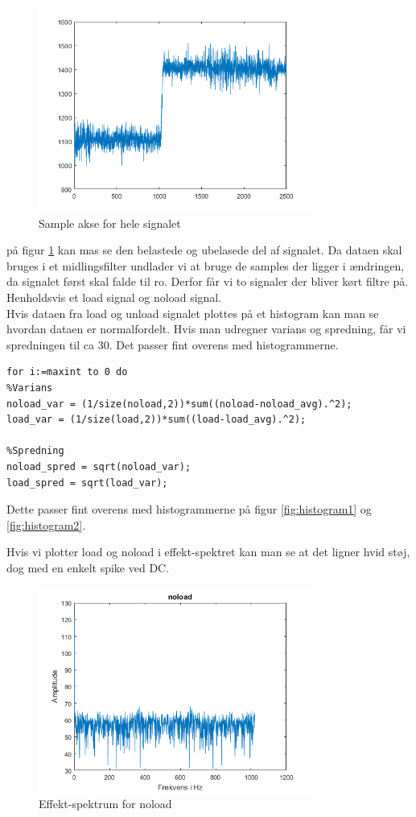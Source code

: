 \documentclass[12pt]{article}
\begin{document}
\begin{figure}[H]
	\centering
	\includegraphics[width=90mm]{Img/sample_akse.png}
	\caption{Sample akse for hele signalet}
	\label{fig:sample_akse}
\end{figure}

på figur \ref{fig:sample_akse} kan mas se den belastede og ubelasede del af signalet. Da dataen skal bruges i et midlingsfilter undlader vi at bruge de samples der ligger i ændringen, da signalet først skal falde til ro. Derfor får vi to signaler der bliver kørt filtre på. Henholdsvis et load signal og noload signal. \\
Hvis dataen fra load og unload signalet plottes på et histogram kan man se hvordan dataen er normalfordelt. Hvis man udregner varians og spredning, får vi spredningen til ca 30. Det passer fint overens med histogrammerne.

\begin{lstlisting}[frame=single]  % Start your code-block
for i:=maxint to 0 do
%Varians
noload_var = (1/size(noload,2))*sum((noload-noload_avg).^2);
load_var = (1/size(load,2))*sum((load-load_avg).^2);

%Spredning
noload_spred = sqrt(noload_var);
load_spred = sqrt(load_var);
\end{lstlisting}

Dette passer fint overens med histogrammerne på figur \ref{fig:histogram1} og \ref{fig:histogram2}.

Hvis vi plotter load og noload i effekt-spektret kan man se at det ligner hvid støj, dog med en enkelt spike ved DC.

\begin{figure}[H]
	\centering
	\includegraphics[width=90mm]{Img/noload_effekt.png}
	\caption{Effekt-spektrum for noload}
	\label{fig:effekt_noload}
\end{figure}
\end{document}
